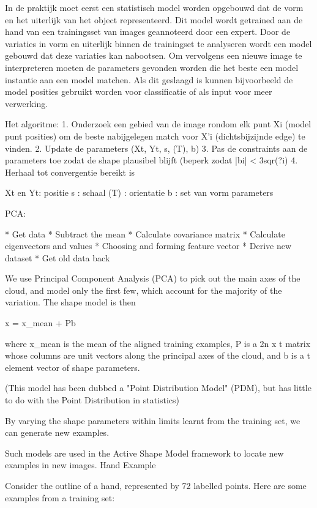 In de praktijk moet eerst een statistisch model worden opgebouwd dat de vorm en het uiterlijk van het object representeerd. Dit model wordt getrained aan de hand van een trainingsset van images geannoteerd door een expert. Door de variaties in vorm en uiterlijk binnen de trainingset te analyseren wordt een model gebouwd dat deze variaties kan nabootsen. Om vervolgens een nieuwe image te interpreteren moeten de parameters gevonden worden die het beste een model instantie aan een model matchen. Als dit geslaagd is kunnen bijvoorbeeld de model posities gebruikt worden voor classificatie of als input voor meer verwerking.

Het algoritme: 1. Onderzoek een gebied van de image rondom elk punt Xi (model punt posities) om de beste nabijgelegen match voor X'i (dichtsbijzijnde edge) te vinden. 2. Update de parameters (Xt, Yt, s, (T), b) 3. Pas de constraints aan de parameters toe zodat de shape plausibel blijft (beperk zodat |bi| < 3sqr(?i) 4. Herhaal tot convergentie bereikt is

Xt en Yt: positie s : schaal (T) : orientatie b : set van vorm parameters

PCA:

    * Get data
    * Subtract the mean
    * Calculate covariance matrix
    * Calculate eigenvectors and values
    * Choosing and forming feature vector
    * Derive new dataset
    * Get old data back 
    
    
We use Principal Component Analysis (PCA) to pick out the main axes of the cloud, and model only the first few, which account for the majority of the variation.
The shape model is then

x = x_mean + Pb

where x_mean is the mean of the aligned training examples, P is a 2n x t matrix whose columns are unit vectors along the principal axes of the cloud, and b is a t element vector of shape parameters.

(This model has been dubbed a "Point Distribution Model" (PDM), but has little to do with the Point Distribution in statistics)

By varying the shape parameters within limits learnt from the training set, we can generate new examples.

Such models are used in the Active Shape Model framework to locate new examples in new images.
Hand Example

Consider the outline of a hand, represented by 72 labelled points.
Here are some examples from a training set:

